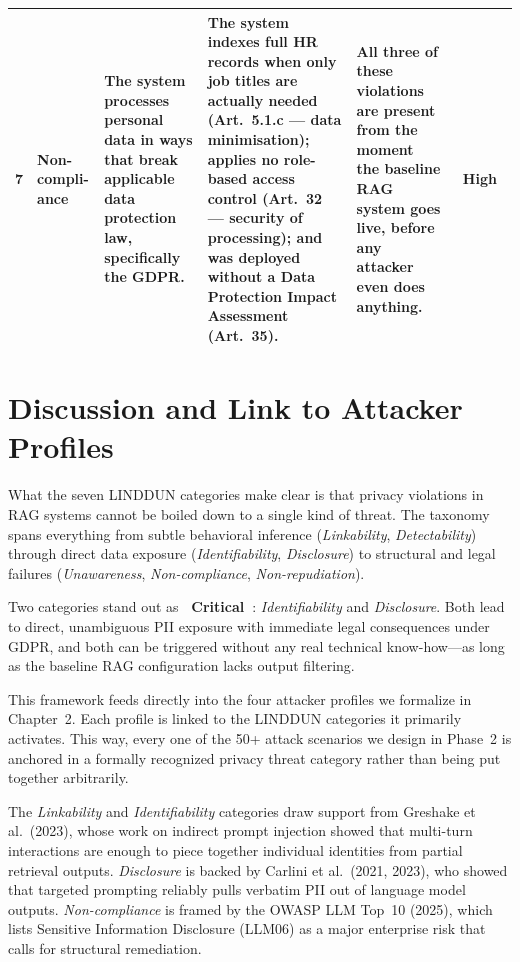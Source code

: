 \documentclass[12pt, a4paper]{report}
\newcommand{\badgecritical}{\colorbox{danger}{\color{white}\small\textbf{~Critical~}}}
\newcommand{\badgehigh}{\colorbox{warn}{\color{white}\small\textbf{~High~}}}
\begin{document}
\begin{longtable}{
    C{0.38cm}
    L{1.85cm}
    L{3.05cm}
    L{3.75cm}
    L{3.25cm}
    C{1.35cm}
  }
  \small 7 &
  \small\textbf{Non-compli-ance} &
  \small The system processes personal data in ways that break applicable
  data protection law, specifically the GDPR. &
  \small The system indexes full HR records when only job titles are actually
  needed (Art.~5.1.c --- data minimisation); applies no role-based access
  control (Art.~32 --- security of processing); and was deployed without a Data
  Protection Impact Assessment (Art.~35). &
  \small All three of these violations are present from the moment
  the baseline RAG system goes live, before any attacker even does anything. &
  \badgehigh \\[4pt]

  \bottomrule
\end{longtable}

\section{Discussion and Link to Attacker Profiles}

What the seven LINDDUN categories make clear is that privacy violations in RAG
systems cannot be boiled down to a single kind of threat. The taxonomy spans
everything from subtle behavioral inference (\emph{Linkability},
\emph{Detectability}) through direct data exposure (\emph{Identifiability},
\emph{Disclosure}) to structural and legal failures (\emph{Unawareness},
\emph{Non-compliance}, \emph{Non-repudiation}).

Two categories stand out as \badgecritical: \emph{Identifiability} and
\emph{Disclosure}. Both lead to direct, unambiguous PII exposure with
immediate legal consequences under GDPR, and both can be triggered without
any real technical know-how---as long as the baseline RAG configuration lacks
output filtering.

This framework feeds directly into the four attacker profiles we formalize in
Chapter~2. Each profile is linked to the LINDDUN categories it primarily
activates. This way, every one of the 50+ attack scenarios we design in Phase~2
is anchored in a formally recognized privacy threat category rather than being
put together arbitrarily.

The \emph{Linkability} and \emph{Identifiability} categories draw support from
Greshake et al.\ (2023), whose work on indirect prompt injection showed
that multi-turn interactions are enough to piece together individual identities
from partial retrieval outputs. \emph{Disclosure} is backed by
Carlini et al.\ (2021, 2023), who showed that targeted prompting reliably
pulls verbatim PII out of language model outputs.
\emph{Non-compliance} is framed by the OWASP LLM Top~10 (2025), which
lists Sensitive Information Disclosure (LLM06) as a major enterprise
risk that calls for structural remediation.
\end{document}
